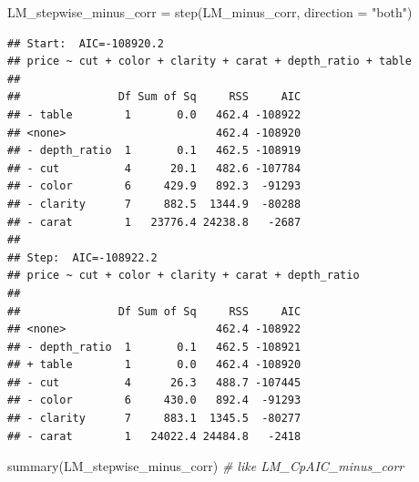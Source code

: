 \documentclass[
]{article}
\newenvironment{Shaded}{\begin{snugshade}}{\end{snugshade}}
\newcommand{\AttributeTok}[1]{\textcolor[rgb]{0.77,0.63,0.00}{#1}}
\newcommand{\CommentTok}[1]{\textcolor[rgb]{0.56,0.35,0.01}{\textit{#1}}}
\newcommand{\FunctionTok}[1]{\textcolor[rgb]{0.00,0.00,0.00}{#1}}
\newcommand{\NormalTok}[1]{#1}
\newcommand{\OtherTok}[1]{\textcolor[rgb]{0.56,0.35,0.01}{#1}}
\newcommand{\StringTok}[1]{\textcolor[rgb]{0.31,0.60,0.02}{#1}}
\begin{document}
\begin{Shaded}
\begin{Highlighting}[]
\NormalTok{LM\_stepwise\_minus\_corr }\OtherTok{=} \FunctionTok{step}\NormalTok{(LM\_minus\_corr, }\AttributeTok{direction =} \StringTok{"both"}\NormalTok{)}
\end{Highlighting}
\end{Shaded}

\begin{verbatim}
## Start:  AIC=-108920.2
## price ~ cut + color + clarity + carat + depth_ratio + table
## 
##               Df Sum of Sq     RSS     AIC
## - table        1       0.0   462.4 -108922
## <none>                       462.4 -108920
## - depth_ratio  1       0.1   462.5 -108919
## - cut          4      20.1   482.6 -107784
## - color        6     429.9   892.3  -91293
## - clarity      7     882.5  1344.9  -80288
## - carat        1   23776.4 24238.8   -2687
## 
## Step:  AIC=-108922.2
## price ~ cut + color + clarity + carat + depth_ratio
## 
##               Df Sum of Sq     RSS     AIC
## <none>                       462.4 -108922
## - depth_ratio  1       0.1   462.5 -108921
## + table        1       0.0   462.4 -108920
## - cut          4      26.3   488.7 -107445
## - color        6     430.0   892.4  -91293
## - clarity      7     883.1  1345.5  -80277
## - carat        1   24022.4 24484.8   -2418
\end{verbatim}

\begin{Shaded}
\begin{Highlighting}[]
\FunctionTok{summary}\NormalTok{(LM\_stepwise\_minus\_corr)   }\CommentTok{\# like LM\_CpAIC\_minus\_corr}
\end{Highlighting}
\end{Shaded}
\end{document}
